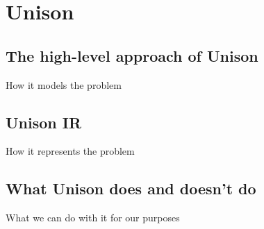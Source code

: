 \section{Unison}

\subsection{The high-level approach of Unison}

How it models the problem

\subsection{Unison IR}

How it represents the problem

\subsection{What Unison does and doesn't do}

What we can do with it for our purposes

